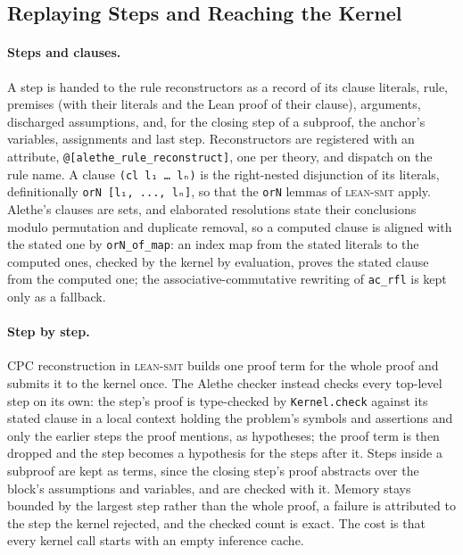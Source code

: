 \documentclass[runningheads]{llncs}
\newcommand{\tactic}{\textsc{lean-smt}\xspace}
\newcommand{\alethe}{Alethe\xspace}
\newcommand{\cpc}{CPC\xspace}
\begin{document}
\subsection{Replaying Steps and Reaching the Kernel}
\label{sec:steps}

\paragraph{Steps and clauses.} A step is handed to the rule reconstructors
as a record of its clause literals, rule, premises (with their literals and
the Lean proof of their clause), arguments, discharged assumptions, and,
for the closing step of a subproof, the anchor's variables, assignments and
last step. Reconstructors are registered with an attribute,
\lstinline{@[alethe_rule_reconstruct]}, one per theory, and dispatch on the
rule name. A clause \texttt{(cl l₁ …\ lₙ)} is the right-nested disjunction
of its literals, definitionally \lstinline{orN [l₁, ..., lₙ]}, so that the
\lstinline{orN} lemmas of \tactic apply. \alethe's clauses are sets, and
elaborated resolutions state their conclusions modulo permutation and
duplicate removal, so a computed clause is aligned with the stated one by
\lstinline{orN_of_map}: an index map from the stated literals to the computed
ones, checked by the kernel by evaluation, proves the stated clause from the
computed one; the associative-commutative rewriting of \texttt{ac\_rfl} is
kept only as a fallback.

\paragraph{Step by step.} \cpc reconstruction in \tactic builds one proof
term for the whole proof and submits it to the kernel once. The \alethe
checker instead checks every top-level step on its own: the step's proof is
type-checked by \texttt{Kernel.check} against its stated clause in a local
context holding the problem's symbols and assertions and only the earlier
steps the proof mentions, as hypotheses; the proof term is then dropped and
the step becomes a hypothesis for the steps after it. Steps inside a
subproof are kept as terms, since the closing step's proof abstracts over
the block's assumptions and variables, and are checked with it. Memory stays
bounded by the largest step rather than the whole proof, a failure is
attributed to the step the kernel rejected, and the checked count is exact.
The cost is that every kernel call starts with an empty inference cache.
\end{document}
